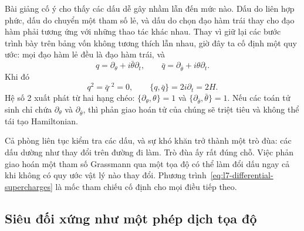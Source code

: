 Bài giảng cố ý cho thấy các dấu dễ gây nhầm lẫn đến mức nào. Dấu do liên hợp phức, dấu do chuyển một tham số lẻ, và dấu do chọn đạo hàm trái thay cho đạo hàm phải tương ứng với những thao tác khác nhau. Thay vì giữ lại các bước trình bày trên bảng vốn không tương thích lẫn nhau, giờ đây ta cố định một quy ước: mọi đạo hàm lẻ đều là đạo hàm trái, và
\begin{equation}
q=\partial_\theta+i\bar\theta\partial_t,
\qquad
\bar q=\partial_{\bar\theta}+i\theta\partial_t.
\label{eq:l7-differential-supercharges}
\end{equation}
Khi đó
\begin{equation}
q^2=\bar q^{,2}=0,
\qquad
\{q,\bar q\}=2i\partial_t=2H.
\label{eq:l7-differential-algebra}
\end{equation}
Hệ số 2 xuất phát từ hai hạng chéo: \(\{\partial_\theta,\theta\}=1\) và \(\{\partial_{\bar\theta},\bar\theta\}=1\). Nếu các toán tử sinh chỉ chứa \(\partial_\theta\) và \(\partial_{\bar\theta}\), thì phản giao hoán tử của chúng sẽ triệt tiêu và không thể tái tạo Hamiltonian.

\begin{classroomqa}
\end{classroomqa}

Cả phòng liên tục kiểm tra các dấu, và sự khó khăn trở thành một trò đùa: các dấu dường như thay đổi trên đường đi làm. Trò đùa ấy rất đúng chỗ. Việc phản giao hoán một tham số Grassmann qua một tọa độ có thể làm đổi dấu ngay cả khi không có quy ước vật lý nào thay đổi. Phương trình~\eqref{eq:l7-differential-supercharges} là mốc tham chiếu cố định cho mọi điều tiếp theo.

\subsection{Siêu đối xứng như một phép dịch tọa độ}

